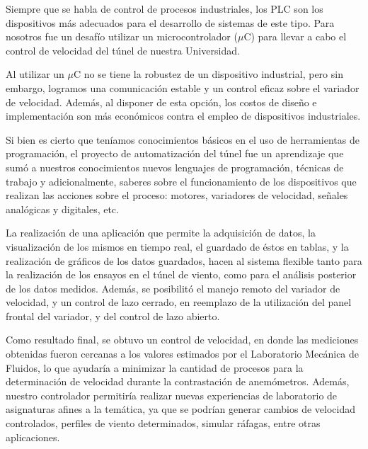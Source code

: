 Siempre que se habla de control de procesos industriales, los PLC son los dispositivos más adecuados para el desarrollo de sistemas de este tipo. Para nosotros fue un desafío utilizar un microcontrolador ($\mu$C) para llevar a cabo el control de velocidad del túnel de nuestra Universidad.

Al utilizar un $\mu$C no se tiene la robustez de un dispositivo industrial, pero sin embargo, logramos una comunicación estable y un control eficaz sobre el variador de velocidad. Además, al disponer de esta opción, los costos de diseño e implementación son más económicos contra el empleo de dispositivos industriales.

Si bien es cierto que teníamos conocimientos básicos en el uso de herramientas de programación, el proyecto de automatización del túnel fue un aprendizaje que sumó a nuestros conocimientos nuevos lenguajes de programación, técnicas de trabajo y adicionalmente, saberes sobre el funcionamiento de los dispositivos que realizan las acciones sobre el proceso: motores, variadores de velocidad, señales analógicas y digitales, etc. 

La realización de una aplicación que permite la adquisición de datos,  la visualización de los mismos en tiempo real, el guardado de éstos en tablas, y la realización de gráficos de los datos guardados, hacen al sistema flexible tanto para la realización de los ensayos en el túnel de viento, como para el análisis posterior de los datos medidos. Además, se posibilitó el manejo remoto del variador de velocidad, y un control de lazo cerrado, en reemplazo de la utilización del panel frontal del variador, y del control de lazo abierto.

Como resultado final, se obtuvo un control de velocidad, en donde las mediciones obtenidas fueron cercanas a los valores estimados por el Laboratorio Mecánica de Fluidos, lo que ayudaría a minimizar la cantidad de procesos para la determinación de velocidad durante la contrastación de anemómetros. Además, nuestro controlador permitiría realizar nuevas experiencias de laboratorio de asignaturas afines a la temática, ya que se podrían generar cambios de velocidad controlados, perfiles de viento determinados, simular ráfagas, entre otras aplicaciones.

